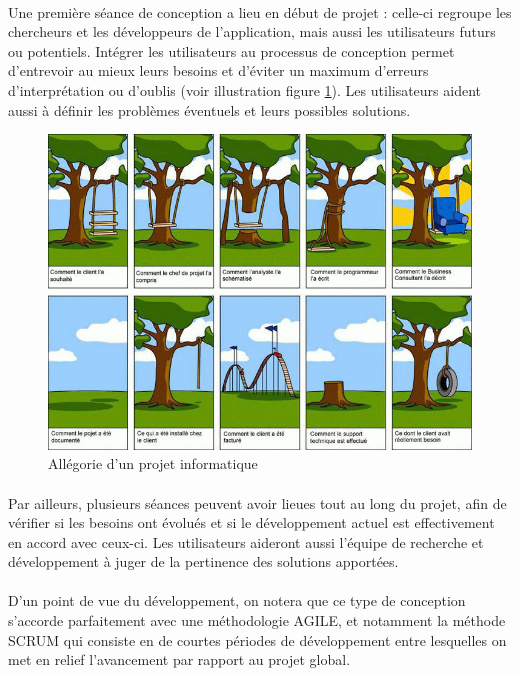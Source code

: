 \paragraph{}
Une première séance de conception a lieu en début de projet : celle-ci regroupe les chercheurs et les développeurs de l'application, mais aussi les utilisateurs futurs ou potentiels. Intégrer les utilisateurs au processus de conception permet d'entrevoir au mieux leurs besoins et d'éviter un maximum d'erreurs d'interprétation ou d'oublis (voir illustration figure \ref{projet_info}). Les utilisateurs aident aussi à définir les problèmes éventuels et leurs possibles solutions.
\begin{figure}
	\centering
	\includegraphics[width=16cm]{images/projet_info.jpg}
	\caption{Allégorie d'un projet informatique}
	\label{projet_info}
\end{figure}

\paragraph{}Par ailleurs, plusieurs séances peuvent avoir lieues tout au long du projet, afin de vérifier si les besoins ont évolués et si le développement actuel est effectivement en accord avec ceux-ci. Les utilisateurs aideront aussi l'équipe de recherche et développement à juger de la pertinence des solutions apportées.
\paragraph{}
D'un point de vue du développement, on notera que ce type de conception s'accorde parfaitement avec une méthodologie AGILE, et notamment la méthode SCRUM qui consiste en de courtes périodes de développement entre lesquelles on met en relief l'avancement par rapport au projet global.

